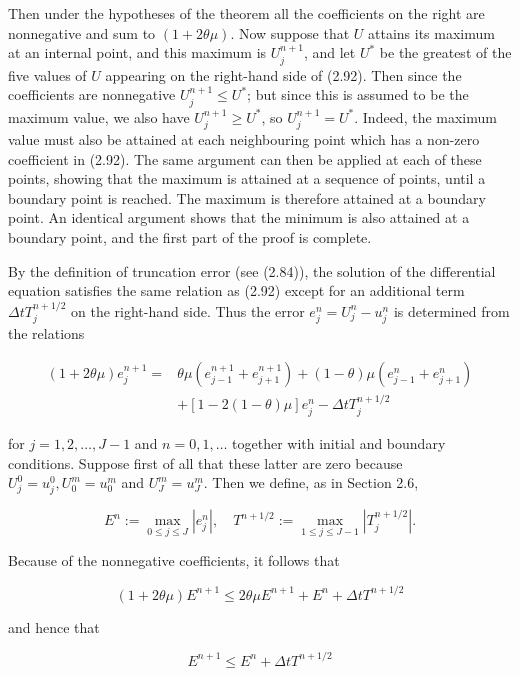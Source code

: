 \documentclass[10pt]{article}
\begin{document}
Then under the hypotheses of the theorem all the coefficients on the right are nonnegative and sum to \((1+2 \theta \mu)\). Now suppose that \(U\) attains its maximum at an internal point, and this maximum is \(U_{j}^{n+1}\), and let \(U^{*}\) be the greatest of the five values of \(U\) appearing on the right-hand side of (2.92). Then since the coefficients are nonnegative \(U_{j}^{n+1} \leq U^{*}\); but since this is assumed to be the maximum value, we also have \(U_{j}^{n+1} \geq U^{*}\), so \(U_{j}^{n+1}=U^{*}\). Indeed, the maximum value must also be attained at each neighbouring point which has a non-zero coefficient in (2.92). The same argument can then be applied at each of these points, showing that the maximum is attained at a sequence of points, until a boundary point is reached. The maximum is therefore attained at a boundary point. An identical argument shows that the minimum is also attained at a boundary point, and the first part of the proof is complete.

By the definition of truncation error (see (2.84)), the solution of the differential equation satisfies the same relation as (2.92) except for an additional term \(\Delta t T_{j}^{n+1 / 2}\) on the right-hand side. Thus the error \(e_{j}^{n}= U_{j}^{n}-u_{j}^{n}\) is determined from the relations

\[
\begin{aligned}
(1+2 \theta \mu) e_{j}^{n+1}= & \theta \mu\left(e_{j-1}^{n+1}+e_{j+1}^{n+1}\right)+(1-\theta) \mu\left(e_{j-1}^{n}+e_{j+1}^{n}\right) \\
& +[1-2(1-\theta) \mu] e_{j}^{n}-\Delta t T_{j}^{n+1 / 2}
\end{aligned}
\]

for \(j=1,2, \ldots, J-1\) and \(n=0,1, \ldots\) together with initial and boundary conditions. Suppose first of all that these latter are zero because \(U_{j}^{0}= u_{j}^{0}, U_{0}^{m}=u_{0}^{m}\) and \(U_{J}^{m}=u_{J}^{m}\). Then we define, as in Section 2.6,

\[
E^{n}:=\max _{0 \leq j \leq J}\left|e_{j}^{n}\right|, \quad T^{n+1 / 2}:=\max _{1 \leq j \leq J-1}\left|T_{j}^{n+1 / 2}\right| .
\]

Because of the nonnegative coefficients, it follows that

\[
(1+2 \theta \mu) E^{n+1} \leq 2 \theta \mu E^{n+1}+E^{n}+\Delta t T^{n+1 / 2}
\]

and hence that

\[
E^{n+1} \leq E^{n}+\Delta t T^{n+1 / 2}
\]
\end{document}
